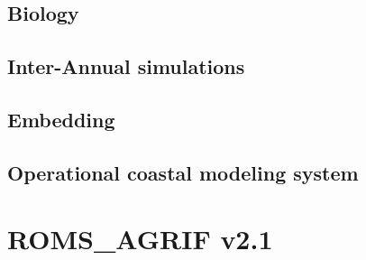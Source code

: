 \documentclass[11pt]{book}
\begin{document}
\section{Biology}


\section{Inter-Annual simulations}


\section{Embedding}


\newpage
\section{Operational coastal modeling system}



\chapter{ROMS\_AGRIF v2.1}

\newpage



\newpage

\newpage

\newpage


\newpage
\begin{thebibliography}{}

\end{thebibliography}
\end{document}

